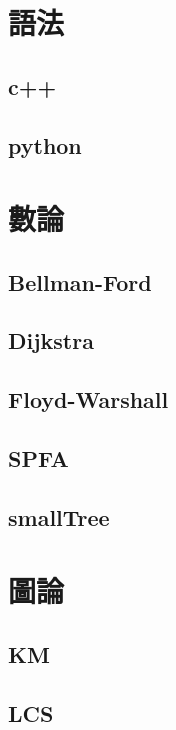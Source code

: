 \section{語法}
    \subsection{c++}
        
    \subsection{python}
        

\section{數論}
    \subsection{Bellman-Ford}
        
    \subsection{Dijkstra}
        
    \subsection{Floyd-Warshall}
        
    \subsection{SPFA}
        
    \subsection{smallTree}
        

\section{圖論}
    \subsection{KM}
        
    \subsection{LCS}
        
